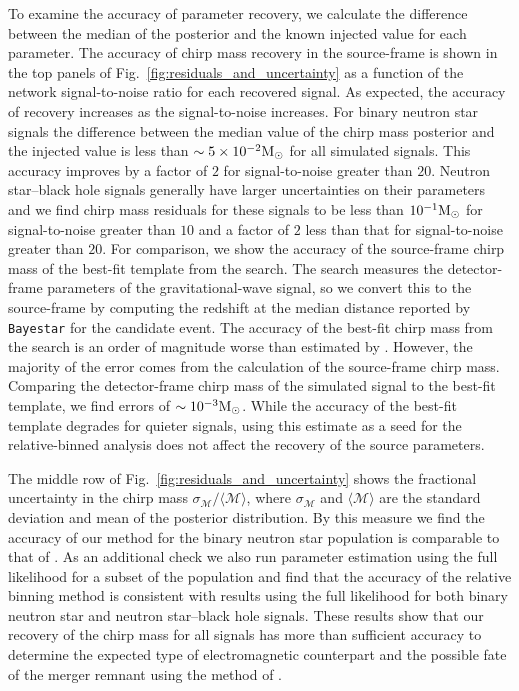 To examine the accuracy of parameter recovery, we calculate the difference between the median of the posterior and the known injected value for each parameter. The accuracy of chirp mass recovery in the source-frame is shown in the top panels of Fig.~\ref{fig:residuals_and_uncertainty} as a function of the network signal-to-noise ratio for each recovered signal. As expected, the accuracy of recovery increases as the signal-to-noise increases. For binary neutron star signals the difference between the median value of the chirp mass posterior and the injected value is less than $\sim 5 \times 10^{-2}\mathrm{M}_{\odot}$ for all simulated signals. This accuracy improves by a factor of $2$ for signal-to-noise greater than $20$. Neutron star--black hole signals generally have larger uncertainties on their parameters and we find chirp mass residuals for these signals to be less than $10^{-1}\mathrm{M}_{\odot}$ for signal-to-noise greater than $10$ and a factor of $2$ less than that for signal-to-noise greater than $20$. For comparison, we show the accuracy of the source-frame chirp mass of the best-fit template from the search. The search measures the detector-frame parameters of the gravitational-wave signal, so we convert this to the source-frame by computing the redshift at the median distance reported by \texttt{Bayestar} for the candidate event. The accuracy of the best-fit chirp mass from the search is an order of magnitude worse than estimated by \cite{Biscoveanu_2019}. However, the majority of the error comes from the calculation of the source-frame chirp mass. Comparing the detector-frame chirp mass of the simulated signal to the best-fit template, we find errors of $\sim 10^{-3}\mathrm{M}_{\odot}$. While the accuracy of the best-fit template degrades for quieter signals, using this  estimate as a seed for the relative-binned analysis does not affect the recovery of the source parameters.

The middle row of Fig.~\ref{fig:residuals_and_uncertainty} shows the fractional uncertainty in the chirp mass $\sigma_\mathcal{M} / \langle \mathcal{M} \rangle$, where $\sigma_\mathcal{M}$ and $\langle \mathcal{M} \rangle$ are the standard deviation and mean of the posterior distribution. By this measure we find the accuracy of our method for the binary neutron star population is comparable to that of \cite{Farr:2015lna}. As an additional check we also run parameter estimation using the full likelihood for a subset of the population and find that the accuracy of the relative binning method is consistent with results using the full likelihood for both binary neutron star and neutron star--black hole signals. These results show that our recovery of the chirp mass for all signals has more than sufficient accuracy to determine the expected type of electromagnetic counterpart and the possible fate of the merger remnant using the method of \cite{Margalit:2019dpi}.

